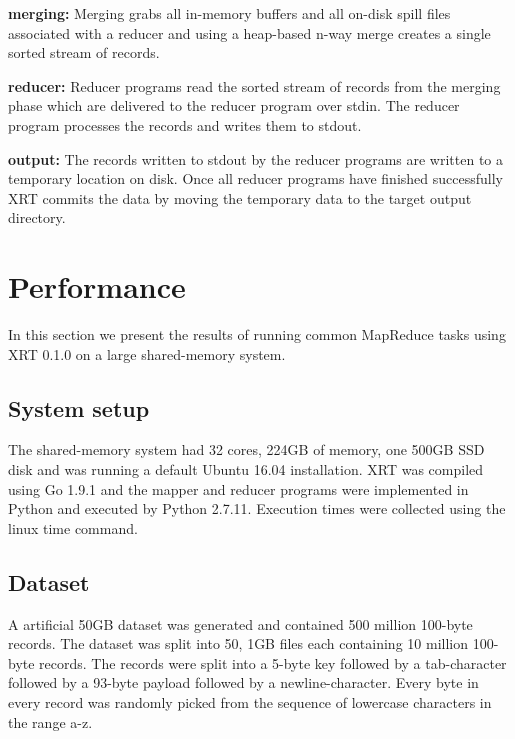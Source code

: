\documentclass[twocolumn,11px]{article}       %
\begin{document}
\bigskip
\noindent
\textbf{merging:} Merging grabs all in-memory buffers and all on-disk spill files associated with a reducer and using a heap-based n-way merge creates a single sorted stream of records.

\bigskip
\noindent
\textbf{reducer:} Reducer programs read the sorted stream of records from the merging phase which are delivered to the reducer program over stdin.
The reducer program processes the records and writes them to stdout.

\bigskip
\noindent
\textbf{output:} The records written to stdout by the reducer programs are written to a temporary location on disk.
Once all reducer programs have finished successfully XRT commits the data by moving the temporary data to the target output directory.

\section{Performance} \label{sec:perf}

In this section we present the results of running common MapReduce tasks using XRT 0.1.0 on a large shared-memory system.

\subsection{System setup}

The shared-memory system had 32 cores, 224GB of memory, one 500GB SSD disk and was running a default Ubuntu 16.04 installation.
XRT was compiled using Go 1.9.1 and the mapper and reducer programs were implemented in Python and executed by Python 2.7.11.
Execution times were collected using the linux time command.

\subsection{Dataset}

A artificial 50GB dataset was generated and contained 500 million 100-byte records.
The dataset was split into 50, 1GB files each containing 10 million 100-byte records.
The records were split into a 5-byte key followed by a tab-character followed by a 93-byte payload followed by a newline-character.
Every byte in every record was randomly picked from the sequence of lowercase characters in the range a-z.
\end{document}
